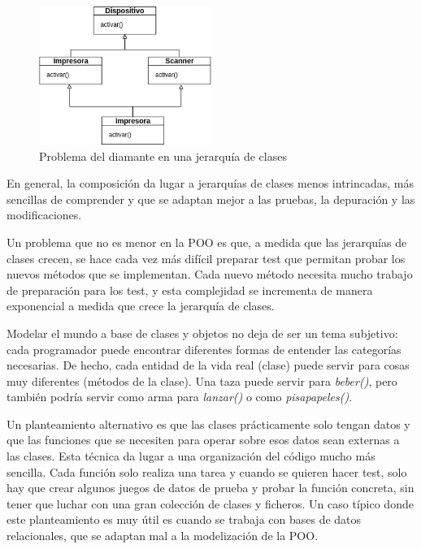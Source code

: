 \vspace{0.7em}
\begin{figure}[htb]
   \begin{center}
      \includegraphics[width=0.5\textwidth]{img/diamante.png}
      \caption{Problema del diamante en una jerarquía de clases}
      \label{fig_diamante}
   \end{center}
\end{figure}

En general, la composición da lugar a jerarquías de clases menos intrincadas, más sencillas de comprender y que se adaptan mejor a las pruebas, la depuración y las modificaciones.

Un problema que no es menor en la POO es que, a medida que las jerarquías de clases crecen, se hace cada vez más difícil preparar test que permitan probar los nuevos métodos que se implementan. Cada nuevo método necesita mucho trabajo de preparación para los test, y esta complejidad se incrementa de manera exponencial a medida que crece la jerarquía de clases.

Modelar el mundo a base de clases y objetos no deja de ser un tema subjetivo: cada programador puede encontrar diferentes formas de entender las categorías necesarias. De hecho, cada entidad de la vida real (clase) puede servir para cosas muy diferentes (métodos de la clase). Una taza puede servir para \textit{beber()}, pero también podría servir como arma para \textit{lanzar()} o como \textit{pisapapeles()}.

Un planteamiento alternativo es que las clases prácticamente solo tengan datos y que las funciones que se necesiten para operar sobre esos datos sean externas a las clases. Esta técnica da lugar a una organización del código mucho más sencilla. Cada función solo realiza una tarea y cuando se quieren hacer test, solo hay que crear algunos juegos de datos de prueba y probar la función concreta, sin tener que luchar con una gran colección de clases y ficheros. Un caso típico donde este planteamiento es muy útil es cuando se trabaja con bases de datos relacionales, que se adaptan mal a la modelización de la POO.


